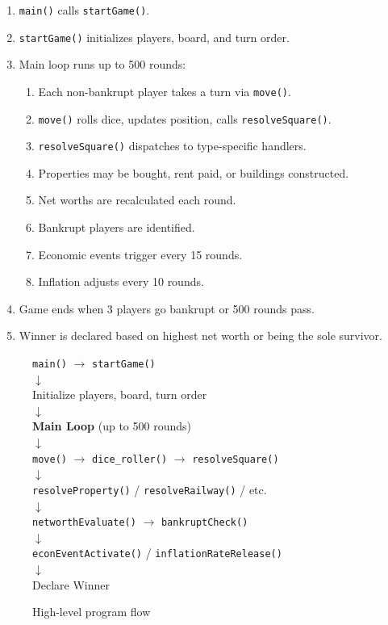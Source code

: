 \documentclass[12pt,a4paper]{article}
\begin{document}
\begin{enumerate}
    \item \texttt{main()} calls \texttt{startGame()}.
    \item \texttt{startGame()} initializes players, board, and turn order.
    \item Main loop runs up to 500 rounds:
    \begin{enumerate}[noitemsep]
        \item Each non-bankrupt player takes a turn via \texttt{move()}.
        \item \texttt{move()} rolls dice, updates position, calls \texttt{resolveSquare()}.
        \item \texttt{resolveSquare()} dispatches to type-specific handlers.
        \item Properties may be bought, rent paid, or buildings constructed.
        \item Net worths are recalculated each round.
        \item Bankrupt players are identified.
        \item Economic events trigger every 15 rounds.
        \item Inflation adjusts every 10 rounds.
    \end{enumerate}
    \item Game ends when 3 players go bankrupt or 500 rounds pass.
    \item Winner is declared based on highest net worth or being the sole survivor.
\end{enumerate}

\begin{figure}[h]
\centering
\begin{tcolorbox}[colback=white, colframe=black, width=0.85\textwidth]
\centering
\texttt{main()} $\rightarrow$ \texttt{startGame()} \\
$\downarrow$ \\
Initialize players, board, turn order \\
$\downarrow$ \\
\textbf{Main Loop} (up to 500 rounds) \\
$\downarrow$ \\
\texttt{move()} $\rightarrow$ \texttt{dice\_roller()} $\rightarrow$ \texttt{resolveSquare()} \\
$\downarrow$ \\
\texttt{resolveProperty()} / \texttt{resolveRailway()} / etc. \\
$\downarrow$ \\
\texttt{networthEvaluate()} $\rightarrow$ \texttt{bankruptCheck()} \\
$\downarrow$ \\
\texttt{econEventActivate()} / \texttt{inflationRateRelease()} \\
$\downarrow$ \\
Declare Winner
\end{tcolorbox}
\caption{High-level program flow}
\end{figure}
\end{document}
